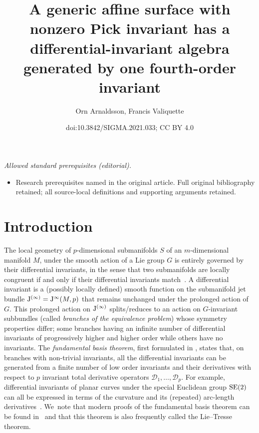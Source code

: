 \documentclass[10pt,a4paper]{amsart}
\title{A generic affine surface with nonzero Pick invariant has a differential-invariant algebra generated by one fourth-order invariant}
\author{Orn Arnaldsson, Francis Valiquette}
\date{doi:10.3842/SIGMA.2021.033; CC BY 4.0}
\numberwithin{equation}{section}
\newcommand{\D}{\mathcal{D}}
\newcommand{\J}{{\rm J}}
\begin{document}
\maketitle
\noindent\textit{Allowed standard prerequisites (editorial).}\begin{itemize}
\item Research prerequisites named in the original article. Full original bibliography retained; all source-local definitions and supporting arguments retained.
\end{itemize}\medskip
\section{Introduction}

The local geometry of $p$-dimensional submanifolds $S$ of an $m$-dimensional manifold $M$, under the smooth action of a Lie group $G$ is entirely governed by their differential invariants, in the sense that two submanifolds are locally congruent if and only if their differential invariants match~\cite{FO-1999,G-74}. A differential invariant is a (possibly locally defined) smooth function on the submanifold jet bundle $\J^{(\infty)}=\J^\infty(M,p)$ that remains unchanged under the prolonged action of~$G$. This prolonged action on $\J^{(\infty)}$ splits/reduces to an action on $G$-invariant subbundles (called \emph{branches of the equivalence problem}) whose symmetry properties differ; some branches having an infinite number of differential invariants of progressively higher and higher order while others have no invariants. The \emph{fundamental basis theorem}, first formulated in \cite[p.~760]{L-1893}, states that, on branches with non-trivial invariants, all the differential invariants can be generated from a finite number of low order invariants and their derivatives with respect to $p$ invariant total derivative operators $\D_1,\dots, \D_p$. For example, differential invariants of planar curves under the special Euclidean group ${\rm SE}(2)$ can all be expressed in terms of the curvature and its (repeated) arc-length derivatives~\cite{O-2001}. We~note that modern proofs of the fundamental basis theorem can be found in~\cite{KL-2006,KL-2016,OP-2007} and that this theorem is also frequently called the Lie--Tresse theorem.
\end{document}
